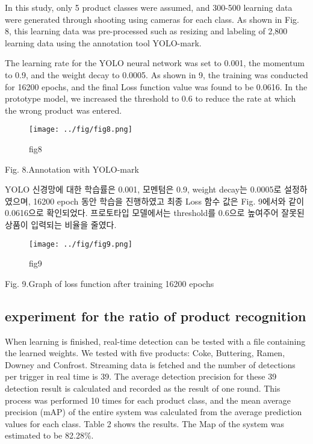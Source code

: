 \documentclass[smallextended]{svjour3}       %
\begin{document}
In this study, only 5 product classes were assumed, and 300-500 learning
data were generated through shooting using cameras for each class. As
shown in Fig. 8, this learning data was pre-processed such as resizing
and labeling of 2,800 learning data using the annotation tool YOLO-mark.

The learning rate for the YOLO neural network was set to 0.001, the
momentum to 0.9, and the weight decay to 0.0005. As shown in 9, the
training was conducted for 16200 epochs, and the final Loss function
value was found to be 0.0616. In the prototype model, we increased the
threshold to 0.6 to reduce the rate at which the wrong product was
entered.

\begin{figure}
\centering
\texttt{[image: ../fig/fig8.png]}
\caption{fig8}
\end{figure}

Fig. 8.Annotation with YOLO-mark

YOLO 신경망에 대한 학습률은 0.001, 모멘텀은 0.9, weight decay는 0.0005로
설정하였으며, 16200 epoch 동안 학습을 진행하였고 최종 Loss 함수 값은
Fig. 9에서와 같이 0.0616으로 확인되었다. 프로토타입 모델에서는
threshold를 0.6으로 높여주어 잘못된 상품이 입력되는 비율을 줄였다.

\begin{figure}
\centering
\texttt{[image: ../fig/fig9.png]}
\caption{fig9}
\end{figure}

Fig. 9.Graph of loss function after training 16200 epochs

\hypertarget{experiment-for-the-ratio-of-product-recognition}{%
\subsection{experiment for the ratio of product
recognition}\label{experiment-for-the-ratio-of-product-recognition}}

When learning is finished, real-time detection can be tested with a file
containing the learned weights. We tested with five products: Coke,
Buttering, Ramen, Downey and Confrost. Streaming data is fetched and the
number of detections per trigger in real time is 39. The average
detection precision for these 39 detection result is calculated and
recorded as the result of one round. This process was performed 10 times
for each product class, and the mean average precision (mAP) of the
entire system was calculated from the average prediction values for each
class. Table 2 shows the results. The Map of the system was estimated to
be 82.28\%.
\end{document}
